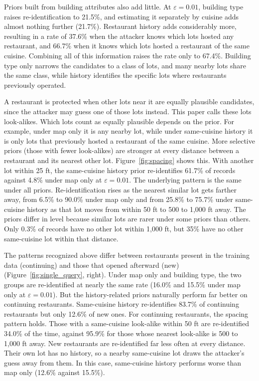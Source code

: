 \documentclass[11pt]{article}
\begin{document}
Priors built from building attributes also add little. At $\varepsilon = 0.01$, building type raises re-identification to 21.5\%, and estimating it separately by cuisine adds almost nothing further (21.7\%). Restaurant history adds considerably more, resulting in a rate of 37.6\% when the attacker knows which lots hosted any restaurant, and 66.7\% when it knows which lots hosted a restaurant of the same cuisine. Combining all of this information raises the rate only to 67.4\%. Building type only narrows the candidates to a class of lots, and many nearby lots share the same class, while history identifies the specific lots where restaurants previously operated.

A restaurant is protected when other lots near it are equally plausible candidates, since the attacker may guess one of those lots instead. This paper calls these lots look-alikes. Which lots count as equally plausible depends on the prior. For example, under map only it is any nearby lot, while under same-cuisine history it is only lots that previously hosted a restaurant of the same cuisine. More selective priors (those with fewer look-alikes) are stronger at every distance between a restaurant and its nearest other lot. Figure~\ref{fig:spacing} shows this. With another lot within 25 ft, the same-cuisine history prior re-identifies 61.7\% of records against 4.8\% under map only at $\varepsilon = 0.01$. The underlying pattern is the same under all priors. Re-identification rises as the nearest similar lot gets farther away, from 6.5\% to 90.0\% under map only and from 25.8\% to 75.7\% under same-cuisine history as that lot moves from within 50 ft to 500 to 1,000 ft away. The priors differ in level because similar lots are rarer under some priors than others. Only 0.3\% of records have no other lot within 1,000 ft, but 35\% have no other same-cuisine lot within that distance.

The patterns recognized above differ between restaurants present in the training data (continuing) and those that opened afterward (new) (Figure~\ref{fig:single_query}, right). Under map only and building type, the two groups are re-identified at nearly the same rate (16.0\% and 15.5\% under map only at $\varepsilon = 0.01$). But the history-related priors naturally perform far better on continuing restaurants. Same-cuisine history re-identifies 83.7\% of continuing restaurants but only 12.6\% of new ones. For continuing restaurants, the spacing pattern holds. Those with a same-cuisine look-alike within 50 ft are re-identified 34.0\% of the time, against 95.9\% for those whose nearest look-alike is 500 to 1,000 ft away. New restaurants are re-identified far less often at every distance. Their own lot has no history, so a nearby same-cuisine lot draws the attacker's guess away from them. In this case, same-cuisine history performs worse than map only (12.6\% against 15.5\%).
\end{document}
